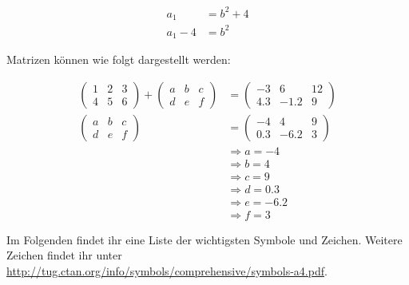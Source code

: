 \documentclass[a4paper, 11pt]{article}
\begin{document}
\begin{align}
	a_1 &= b^2 +4 \\
	a_1 - 4 &= b^2
\end{align}

Matrizen können wie folgt dargestellt werden:

\begin{align*}
\begin{pmatrix}
1 & 2 & 3 \\
4 & 5 & 6
\end{pmatrix} 
+ 
\begin{pmatrix}
a & b & c\\
d & e & f
\end{pmatrix} 
&= 
\begin{pmatrix}
-3 & 6 & 12 \\
4.3 & -1.2 & 9 
\end{pmatrix}
\\[5pt]
\begin{pmatrix}
a & b & c\\
d & e & f
\end{pmatrix} 
&= 
\begin{pmatrix}
-4 & 4 & 9 \\
0.3 & -6.2 & 3 
\end{pmatrix}
\\[5pt]
&\Rightarrow a = -4 \\[2pt]
&\Rightarrow b = 4 \\[2pt]
&\Rightarrow c = 9 \\[2pt]
&\Rightarrow d = 0.3 \\[2pt]
&\Rightarrow e = -6.2 \\[2pt]
&\Rightarrow f = 3 
\end{align*}

Im Folgenden findet ihr eine Liste der wichtigsten Symbole und Zeichen. Weitere Zeichen findet ihr unter
\url{http://tug.ctan.org/info/symbols/comprehensive/symbols-a4.pdf}.
\end{document}
